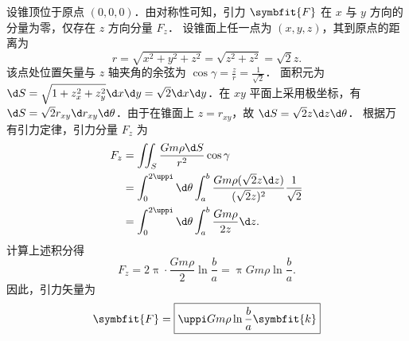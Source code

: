 \begin{solution}
    设锥顶位于原点 $(0,0,0)$．由对称性可知，引力 $\symbfit{F}$ 在 $x$ 与 $y$ 方向的分量为零，仅存在 $z$ 方向分量 $F_z$．
    设锥面上任一点为 $(x, y, z)$，其到原点的距离为
    \begin{equation}
        r = \sqrt{x^2 + y^2 + z^2} = \sqrt{z^2 + z^2} = \sqrt{2} z.
    \end{equation}
    该点处位置矢量与 $z$ 轴夹角的余弦为 $\cos \gamma = \frac{z}{r} = \frac{1}{\sqrt{2}}$．
    面积元为 $\d S = \sqrt{1 + z_x^2 + z_y^2} \d x \d y = \sqrt{2} \d x \d y$．在 $xy$ 平面上采用极坐标，有 $\d S = \sqrt{2} r_{xy} \d r_{xy} \d \theta$．由于在锥面上 $z = r_{xy}$，故 $\d S = \sqrt{2} z \d z \d \theta$．
    根据万有引力定律，引力分量 $F_z$ 为
    \begin{equation}
        \begin{aligned}
            F_z & = \iint_{S} \frac{G m \rho \d S}{r^2} \cos \gamma                                                               \\
                & = \int_{0}^{2\uppi} \d \theta \int_{a}^{b} \frac{G m \rho (\sqrt{2} z \d z)}{(\sqrt{2} z)^2} \frac{1}{\sqrt{2}} \\
                & = \int_{0}^{2\uppi} \d \theta \int_{a}^{b} \frac{G m \rho}{2 z} \d z.
        \end{aligned}
    \end{equation}
    计算上述积分得
    \begin{equation}
        F_z = 2\uppi \cdot \frac{G m \rho}{2} \ln \frac{b}{a} = \uppi G m \rho \ln \frac{b}{a}.
    \end{equation}
    因此，引力矢量为
    \begin{equation}
        \symbfit{F} = \boxed{\uppi G m \rho \ln \frac{b}{a} \symbfit{k}}
    \end{equation}
\end{solution}

\endinput
